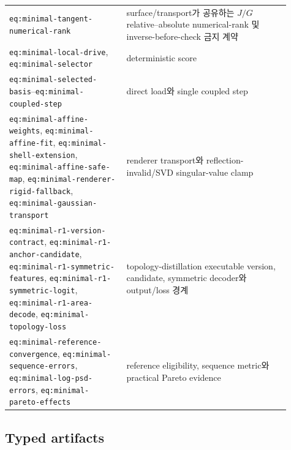 \documentclass[10pt]{article}
\newcommand{\code}[1]{{\small\nolinkurl{#1}}}
\begin{document}
\begin{longtable}{L{0.38\linewidth}L{0.53\linewidth}}
\code{eq:minimal-tangent-numerical-rank} &
surface/transport가 공유하는 \(J/G\) relative--absolute numerical-rank 및 inverse-before-check 금지 계약\\
\code{eq:minimal-local-drive}, \code{eq:minimal-selector} & deterministic score\\
\code{eq:minimal-selected-basis}--\code{eq:minimal-coupled-step} & direct load와 single coupled step\\
\code{eq:minimal-affine-weights}, \code{eq:minimal-affine-fit}, \code{eq:minimal-shell-extension},
\code{eq:minimal-affine-safe-map},
\code{eq:minimal-renderer-rigid-fallback}, \code{eq:minimal-gaussian-transport} & renderer transport와
reflection-invalid/SVD singular-value clamp\\
\code{eq:minimal-r1-version-contract}, \code{eq:minimal-r1-anchor-candidate},
\code{eq:minimal-r1-symmetric-features}, \code{eq:minimal-r1-symmetric-logit},
\code{eq:minimal-r1-area-decode}, \code{eq:minimal-topology-loss} &
topology-distillation executable version, candidate, symmetric decoder와 output/loss 경계\\
\code{eq:minimal-reference-convergence}, \code{eq:minimal-sequence-errors},
\code{eq:minimal-log-psd-errors}, \code{eq:minimal-pareto-effects} &
reference eligibility, sequence metric와 practical Pareto evidence\\
\bottomrule
\end{longtable}

\subsection{Typed artifacts}
\end{document}
